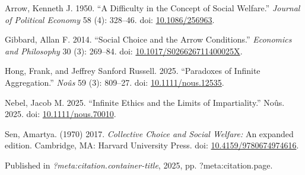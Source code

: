\documentclass[
  11pt,
  letterpaper,
  DIV=11,
  numbers=noendperiod,
  twoside]{scrartcl}
\newlength{\cslhangindent}
\newenvironment{CSLReferences}[2] %
 {\begin{list}{}{%
  \setlength{\itemindent}{0pt}
  \setlength{\leftmargin}{0pt}
  \setlength{\parsep}{0pt}
  \ifodd #1
   \setlength{\leftmargin}{\cslhangindent}
   \setlength{\itemindent}{-1\cslhangindent}
  \fi
  \setlength{\itemsep}{#2\baselineskip}}}
 {\end{list}}
\begin{document}
\label{refs}
\begin{CSLReferences}{1}{0}
Arrow, Kenneth J. 1950. {``A Difficulty in the Concept of Social
Welfare.''} \emph{Journal of Political Economy} 58 (4): 328--46. doi:
\href{https://doi.org/10.1086/256963}{10.1086/256963}.

Gibbard, Allan F. 2014. {``Social Choice and the Arrow Conditions.''}
\emph{Economics and Philosophy} 30 (3): 269--84. doi:
\href{https://doi.org/10.1017/S026626711400025X}{10.1017/S026626711400025X}.

Hong, Frank, and Jeffrey Sanford Russell. 2025. {``Paradoxes of Infinite
Aggregation.''} \emph{Noûs} 59 (3): 809--27. doi:
\href{https://doi.org/10.1111/nous.12535}{10.1111/nous.12535}.

Nebel, Jacob M. 2025. {``Infinite Ethics and the Limits of
Impartiality.''} No{û}s. 2025. doi:
\href{https://doi.org/10.1111/nous.70010}{10.1111/nous.70010}.

Sen, Amartya. (1970) 2017. \emph{Collective Choice and Social Welfare:}
An expanded edition. Cambridge, MA: Harvard University Press. doi:
\href{https://doi.org/10.4159/9780674974616}{10.4159/9780674974616}.

\end{CSLReferences}



\noindent Published in\emph{
?meta:citation.container-title}, 2025, pp. ?meta:citation.page.
\end{document}
